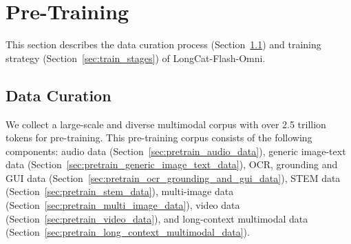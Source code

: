 \documentclass{article}
\newcommand{\longcat}{LongCat-Flash-Omni\xspace}
\begin{document}
\section{Pre-Training}
\label{sec:pre-train}


This section describes the data curation process (Section~\ref{sec:pretrain_data_curation}) and training strategy (Section~\ref{sec:train_stages}) of \longcat.

\subsection{Data Curation} \label{sec:pretrain_data_curation}
We collect a large-scale and diverse multimodal corpus with over 2.5 trillion tokens for pre-training. This pre-training corpus consists of the following components: audio data (Section~\ref{sec:pretrain_audio_data}), generic image-text data (Section~\ref{sec:pretrain_generic_image_text_data}), OCR, grounding and GUI data (Section~\ref{sec:pretrain_ocr_grounding_and_gui_data}), STEM data (Section~\ref{sec:pretrain_stem_data}), multi-image data (Section~\ref{sec:pretrain_multi_image_data}), video data (Section~\ref{sec:pretrain_video_data}), and long-context multimodal data (Section~\ref{sec:pretrain_long_context_multimodal_data}).
\end{document}
